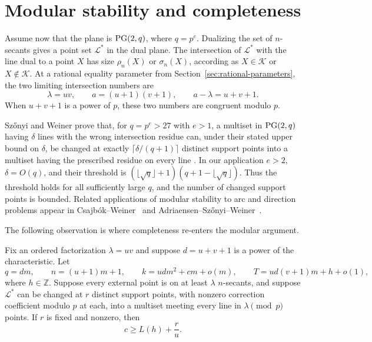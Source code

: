 \section{Modular stability and completeness}\label{sec:modular-stability}

Assume now that the plane is \(\mathrm{PG}(2,q)\), where \(q=p^e\).  Dualizing the
set of \(n\)-secants gives a point set \(\mathcal L^*\) in the dual plane.
The intersection of \(\mathcal L^*\) with the line dual to a point
\(X\) has size \(\rho_n(X)\) or \(\sigma_n(X)\), according as
\(X\in\mathcal K\) or \(X\notin\mathcal K\).  At a rational equality
parameter from Section~\ref{sec:rational-parameters}, the two limiting
intersection numbers are
\[
 \lambda=uv,\qquad a=(u+1)(v+1),\qquad a-\lambda=u+v+1.
\]
When \(u+v+1\) is a power of \(p\), these two numbers are congruent modulo
\(p\).

Sz\H{o}nyi and Weiner prove that, for \(q=p^e>27\) with \(e>1\), a multiset in
\(\mathrm{PG}(2,q)\) having \(\delta\) lines with the wrong intersection residue can,
under their stated upper bound on \(\delta\), be changed at exactly
\(\lceil\delta/(q+1)\rceil\) distinct support points into a multiset having
the prescribed residue on every line \cite[Theorem~1.2]{SWmodp}.  In our
application \(e>2\), \(\delta=O(q)\), and their threshold is
\((\lfloor\sqrt q\rfloor+1)(q+1-\lfloor\sqrt q\rfloor)\).  Thus the threshold
holds for all sufficiently large \(q\), and the number of changed support
points is bounded.  Related applications of
modular stability to arc and direction problems appear in
Csajb\'ok--Weiner~\cite{CsajbokWeiner} and
Adriaensen--Sz\H{o}nyi--Weiner~\cite{AdriaensenSzonyiWeiner}.

The following observation is where completeness re-enters the modular
argument.

\begin{lemma}
\label{lem:repair-support}
Fix an ordered factorization \(\lambda=uv\) and suppose
\(d=u+v+1\) is a power of the characteristic.  Let
\[
 q=dm,\qquad n=(u+1)m+1,\qquad
 k=udm^2+cm+o(m),\qquad
 T=ud(v+1)m+h+o(1),
\]
where \(h\in\mathbb Z\).  Suppose every external point is on at least
\(\lambda\) \(n\)-secants, and suppose \(\mathcal L^*\) can be changed at
\(r\) distinct support points, with nonzero correction coefficient modulo
\(p\) at each, into a multiset meeting every line in \(\lambda\pmod p\)
points.  If \(r\) is fixed and nonzero, then
\begin{equation}\label{eq:repair-support-bound}
 c\ge L(h)+\frac ru.
\end{equation}
\end{lemma}

